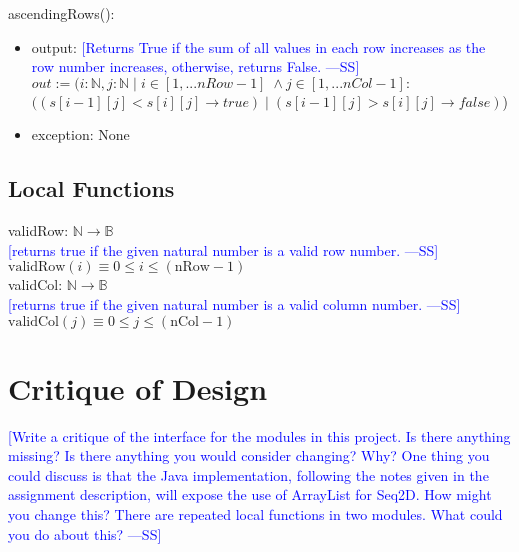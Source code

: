 \documentclass[12pt]{article}
\newcommand{\authornote}[3]{\textcolor{#1}{[#3 ---#2]}}
\newcommand{\authornote}[3]{}
\newcommand{\wss}[1]{\authornote{blue}{SS}{#1}}
\begin{document}
\noindent ascendingRows():
\begin{itemize}
\item output: \wss{Returns True if the sum of all values in each row increases
    as the row number increases, otherwise, returns False.} \\$out := (i: \mathbb{N}, j : \mathbb{N} \; | \; i \in [1,...nRow-1] \; \land j \in [1,...nCol-1] :$ $((s[i-1][j] < s[i][j] \rightarrow true) \; | \;(s[i-1][j] > s[i][j] \rightarrow false)$)
\item exception: None
\end{itemize}

\subsection*{Local Functions}

\noindent validRow: $\mathbb{N} \rightarrow \mathbb{B}$\\
\noindent \wss{returns true if the given natural number is a valid row
  number.}$\mbox{validRow}(i) \equiv 0 \leq i \leq (\mbox{nRow} - 1)$\\

\noindent validCol: $\mathbb{N} \rightarrow \mathbb{B}$\\
\noindent \wss{returns true if the given natural number is a valid column
  number.}$\mbox{validCol}(j) \equiv 0 \leq j \leq (\mbox{nCol} - 1)$\\

\newpage

\section*{Critique of Design}

\wss{Write a critique of the interface for the modules in this project.  Is there
anything missing?  Is there anything you would consider changing?  Why?  One
thing you could discuss is that the Java implementation, following the notes
given in the assignment description, will expose the use of ArrayList for Seq2D.
 How might you change this?  There are repeated local functions in two modules.
What could you do about this?}\\
\end{document}
